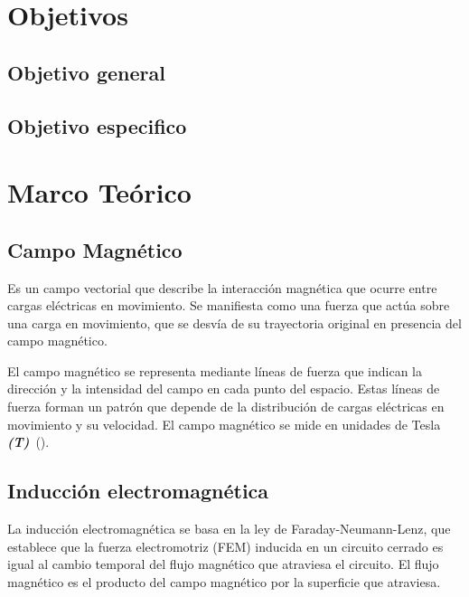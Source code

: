 \documentclass[twocolumn, 12pt]{article}
\begin{document}

\section{Objetivos}

\subsection{Objetivo general}

\subsection{Objetivo especifico}


\section{Marco Teórico}

\subsection*{Campo Magnético}

Es un campo vectorial que describe la interacción magnética
que ocurre entre cargas eléctricas en movimiento. Se
manifiesta como una fuerza que actúa sobre una carga en
movimiento, que se desvía de su trayectoria original en
presencia del campo magnético.

El campo magnético se representa mediante líneas de fuerza
que indican la dirección y la intensidad del campo en cada
punto del espacio. Estas líneas de fuerza forman un patrón
que depende de la distribución de cargas eléctricas en
movimiento y su velocidad. El campo magnético se mide en
unidades de Tesla
\textit{\textbf{(T)}}~(\cite{magnetic-fields-khanacademy}).

\subsection*{Inducción electromagnética}

La inducción electromagnética se basa en la ley de
Faraday-Neumann-Lenz, que establece que la fuerza
electromotriz (FEM) inducida en un circuito cerrado es
igual al cambio temporal del flujo magnético que atraviesa
el circuito. El flujo magnético es el producto del campo
magnético por la superficie que atraviesa.
\end{document}
